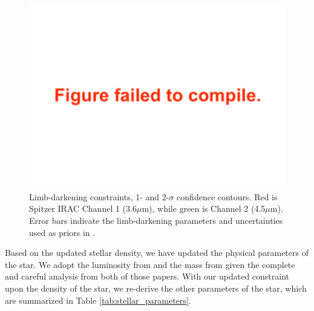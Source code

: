 \documentclass[twocolumn]{aastex63}
\begin{document}
\begin{figure}
    \centering
    \includegraphics[width=\hsize]{figures/limb_darkening_nouprior.pdf}
    {Limb-darkening constraints, 1- and 2-$\sigma$ confidence contours.  Red is Spitzer IRAC Channel 1 (3.6$\mu$m), while green is Channel 2 (4.5$\mu$m).  Error bars indicate the limb-darkening parameters and uncertainties used as priors in \citet{Ducrot2020}}.
    \label{fig:limb_darkening}
\end{figure}

Based on the updated stellar density, we have updated the physical
parameters of the star.  We adopt the luminosity from \citet{Ducrot2020}
and the mass from \citet{Mann2019} given the complete and careful analysis
from both of those papers.  With our updated constraint upon the density
of the star, we re-derive the other parameters of the star, which are summarized in Table \ref{tab:stellar_parameters}.
\end{document}
